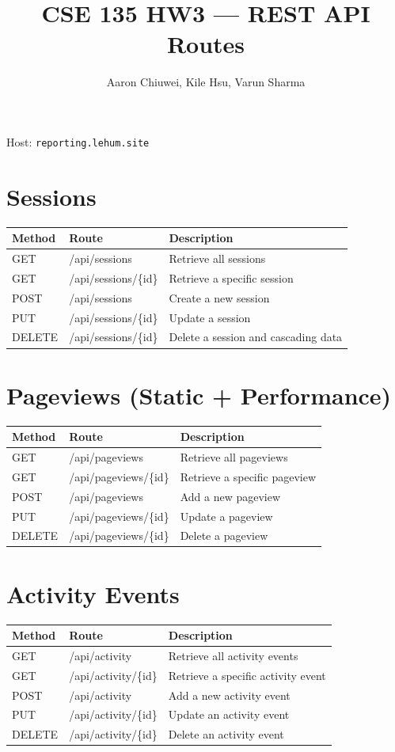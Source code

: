 \documentclass[11pt]{article}
\title{CSE 135 HW3 --- REST API Routes}
\author{Aaron Chiuwei, Kile Hsu, Varun Sharma}
\date{}
\begin{document}
\maketitle
\noindent Host: \texttt{reporting.lehum.site}

\section*{Sessions}
\begin{tabular}{@{}llp{7.5cm}@{}}
\toprule
Method & Route & Description \\
\midrule
GET    & /api/sessions       & Retrieve all sessions \\
GET    & /api/sessions/\{id\}  & Retrieve a specific session \\
POST   & /api/sessions       & Create a new session \\
PUT    & /api/sessions/\{id\}  & Update a session \\
DELETE & /api/sessions/\{id\}  & Delete a session and cascading data \\
\bottomrule
\end{tabular}

\section*{Pageviews (Static + Performance)}
\begin{tabular}{@{}llp{7.5cm}@{}}
\toprule
Method & Route & Description \\
\midrule
GET    & /api/pageviews       & Retrieve all pageviews \\
GET    & /api/pageviews/\{id\}  & Retrieve a specific pageview \\
POST   & /api/pageviews       & Add a new pageview \\
PUT    & /api/pageviews/\{id\}  & Update a pageview \\
DELETE & /api/pageviews/\{id\}  & Delete a pageview \\
\bottomrule
\end{tabular}

\section*{Activity Events}
\begin{tabular}{@{}llp{7.5cm}@{}}
\toprule
Method & Route & Description \\
\midrule
GET    & /api/activity       & Retrieve all activity events \\
GET    & /api/activity/\{id\}  & Retrieve a specific activity event \\
POST   & /api/activity       & Add a new activity event \\
PUT    & /api/activity/\{id\}  & Update an activity event \\
DELETE & /api/activity/\{id\}  & Delete an activity event \\
\bottomrule
\end{tabular}
\end{document}
